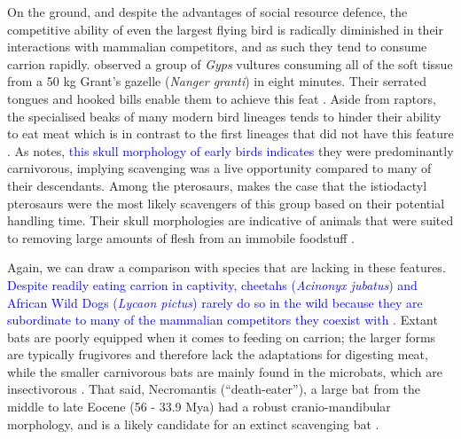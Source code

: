 \documentclass[a4paper,12pt]{article}
\begin{document}
On the ground, and despite the advantages of social resource defence, the competitive ability of even the largest flying bird is radically diminished in their interactions with mammalian competitors, and as such they tend to consume carrion rapidly. 
\cite{houston1974role} observed a group of \textit{Gyps} vultures consuming all of the soft tissue from a 50 kg Grant’s gazelle (\textit{Nanger granti}) in eight minutes. 
Their serrated tongues and hooked bills enable them to achieve this feat \citep{houston1975digestive}. 
Aside from raptors, the specialised beaks of many modern bird lineages tends to hinder their ability to eat meat which is in contrast to the first lineages that did not have this feature \citep{martyniuk2012field}. 
As \cite{martyniuk2012field} notes, \textcolor{blue}{this skull morphology of early birds indicates} they were predominantly carnivorous, implying scavenging was a live opportunity compared to many of their descendants. 
Among the pterosaurs, \cite{witton2013pterosaurs} makes the case that the istiodactyl pterosaurs were the most likely scavengers of this group based on their potential handling time. 
Their skull morphologies are indicative of animals that were suited to removing large amounts of flesh from an immobile foodstuff \citep{witton2013pterosaurs}. 

Again, we can draw a comparison with species that are lacking in these features. 
\textcolor{blue}{Despite readily eating carrion in captivity, cheetahs (\textit{Acinonyx jubatus}) and African Wild Dogs (\textit{Lycaon pictus}) rarely do so in the wild because they are subordinate to many of the mammalian competitors they coexist with \citep{pereira2014facultative}.} 
Extant bats are poorly equipped when it comes to feeding on carrion; the larger forms are typically frugivores and therefore lack the adaptations for digesting meat, while the smaller carnivorous bats are mainly found in the microbats, which are insectivorous \citep{aguirre2003implications}.   
That said, Necromantis (“death-eater”), a large bat from the middle to late Eocene (56 - 33.9 Mya) had a robust cranio-mandibular morphology, and is a likely candidate for an extinct scavenging bat \citep{Weithofer_Necromantis_1887,Hand_Necromantis_2012}.
\end{document}
